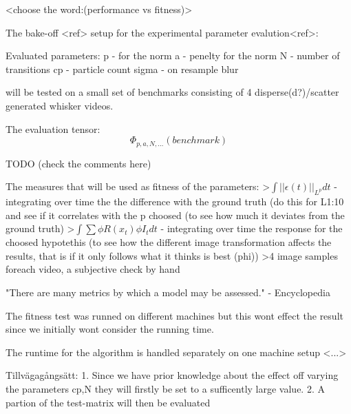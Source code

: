 
<choose the word:(performance vs fitness)>

The bake-off <ref> setup for the experimental parameter evalution<ref>:

Evaluated parameters:
    p     - for the norm
    a     - penelty for the norm
    N     - number of transitions
    cp    - particle count
    sigma - on resample blur

will be tested on a small set of benchmarks consisting of 4 disperse(d?)/scatter generated whisker videos.

The evaluation tensor:
\begin{equation}
    \Phi_{p,a,N,...}(benchmark)
\end{equation}

TODO (check the comments here)

The measures that will be used as fitness of the parameters:
    >$\int{||\epsilon(t)||_{L^p}}dt$ - integrating over time the the difference
    with the ground truth (do this for L{1:10} and see if it correlates with
    the p choosed (to see how much it deviates from the ground truth)
    >$\int{\sum{\phi{R(x_t)}\phi{I_t}} }dt$ - integrating over time the response
    for the choosed hypotethis (to see how the different image transformation
        affects the results, that is if it only follows what it thinks is best
        (phi))
    >4 image samples foreach video, a subjective check by hand


"There are many metrics by which a model may be assessed." - Encyclopedia


The fitness test was runned on different machines but this wont effect the
result since we initially wont consider the running time.

The runtime for the algorithm is handled separately on one machine setup <...>



Tillvägagångsätt:
1. Since we have prior knowledge about the effect off varying the parameters cp,N
they will firstly be set to a sufficently large value.
2. A partion of the test-matrix will then be evaluated 
